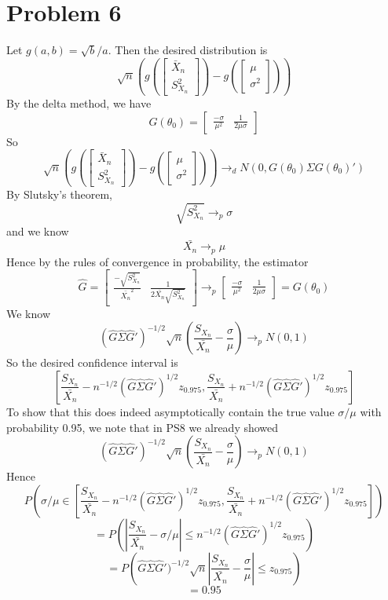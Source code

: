 \documentclass[10pt,letter]{article}
\begin{document}
\section*{Problem 6}
Let $g(a, b) = \sqrt{b}/a$. Then the desired distribution is
\[ \sqrt{n} \left( g\left(\begin{bmatrix}\bar{X}_n\\ S^2_{X_n}\end{bmatrix}\right) - g\left(\begin{bmatrix} \mu \\ \sigma^2 \end{bmatrix}\right)\right)\]
By the delta method, we have
\[ G(\theta_0) = \begin{bmatrix} \frac{-\sigma}{\mu^2} & \frac{1}{2\mu\sigma} \end{bmatrix}\]
So
\[ \sqrt{n} \left( g\left(\begin{bmatrix}\bar{X}_n\\ S^2_{X_n}\end{bmatrix}\right) - g\left(\begin{bmatrix} \mu \\ \sigma^2 \end{bmatrix}\right)\right) \to_d N(0, G(\theta_0)\Sigma G(\theta_0)')\]
By Slutsky's theorem,
\[ \sqrt{S^2_{X_n}} \to_p \sigma \]
and we know
\[ \bar{X_n} \to_p \mu \]
Hence by the rules of convergence in probability, the estimator
\[ \hat{G} = \begin{bmatrix} \frac{-\sqrt{S^2_{X_n}} }{\bar{X_n} ^2} & \frac{1}{2\bar{X_n} \sqrt{S^2_{X_n}} } \end{bmatrix} \to_p \begin{bmatrix} \frac{-\sigma}{\mu^2} & \frac{1}{2\mu\sigma} \end{bmatrix}= G(\theta_0) \]
We know
\[ (\hat{G}\hat{\Sigma}\hat{G}')^{-1/2} \sqrt{n} \left(\frac{S_{X_n}}{\bar{X_n}} - \frac{\sigma}{\mu} \right) \to_p N(0,1) \]
So the desired confidence interval is
\[ \left[\frac{S_{X_n}}{\bar{X_n}} - n^{-1/2}(\hat{G}\hat{\Sigma}\hat{G}')^{1/2}z_{0.975}, \frac{S_{X_n}}{\bar{X_n}} +n^{-1/2}(\hat{G}\hat{\Sigma}\hat{G}')^{1/2}z_{0.975} \right] \]
To show that this does indeed asymptotically contain the true value $\sigma/\mu$ with probability 0.95, we note that in PS8 we already showed
\[ (\hat{G}\hat{\Sigma}\hat{G}')^{-1/2} \sqrt{n} \left(\frac{S_{X_n}}{\bar{X_n}} - \frac{\sigma}{\mu} \right) \to_p N(0,1) \]
Hence
\[ P\left(\sigma/\mu \in \left[\frac{S_{X_n}}{\bar{X_n}} - n^{-1/2}(\hat{G}\hat{\Sigma}\hat{G}')^{1/2}z_{0.975}, \frac{S_{X_n}}{\bar{X_n}} +n^{-1/2}(\hat{G}\hat{\Sigma}\hat{G}')^{1/2}z_{0.975} \right]\right) \]
\[ = P\left(\left|\frac{S_{X_n}}{\bar{X_n}} - \sigma/\mu\right| \le  n^{-1/2}(\hat{G}\hat{\Sigma}\hat{G}')^{1/2}z_{0.975} \right) \]
\[ = P\left( \hat{G}\hat{\Sigma}\hat{G}')^{-1/2} \sqrt{n} \left|\frac{S_{X_n}}{\bar{X_n}} - \frac{\sigma}{\mu} \right| \le  z_{0.975} \right) \]
\[ = 0.95 \]
\end{document}
